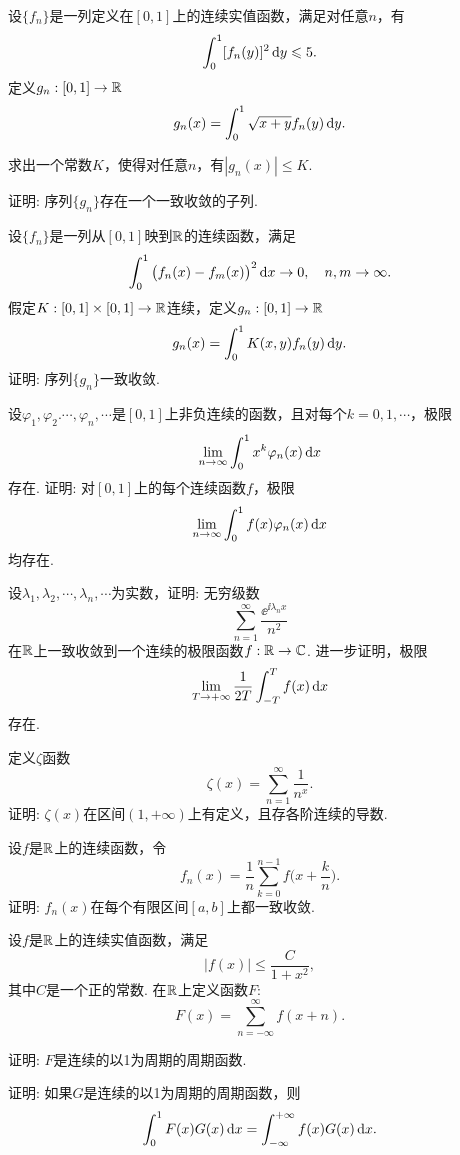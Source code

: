 \begin{example}
  设$\{f_n\}$是一列定义在$[0,1]$上的连续实值函数，满足对任意$n$，有
  \[ \int_0^1[f_n(y)]^2\,\mathrm dy \leqslant 5. \]
  定义$g_n:[0,1]\to\mathbb R$
  \[ g_n(x) = \int_0^1\sqrt{x+y}f_n(y)\,\mathrm dy. \]
  \begin{eenum}
    \item 求出一个常数$K$，使得对任意$n$，有$|g_n(x)|\le K$.
    \item 证明: 序列$\{g_n\}$存在一个一致收敛的子列.
  \end{eenum}
\end{example}

\begin{example}
  设$\{f_n\}$是一列从$[0,1]$映到$\mathbb R$的连续函数，满足
  \[ \int_0^1\big( f_n(x)-f_m(x)\big)^2\,\mathrm dx\to0,\quad n,m\to\infty. \]
  假定$K:[0,1]\times[0,1]\to\mathbb R$连续，定义$g_n:[0,1]\to\mathbb R$
  \[ g_n(x) = \int_0^1K(x,y)f_n(y)\,\mathrm dy. \]
  证明: 序列$\{g_n\}$一致收敛.
\end{example}

\begin{example}
  设$\varphi_1,\varphi_2.\cdots,\varphi_n,\cdots$是$[0,1]$上非负连续的函数，且对每个$k=0,1,\cdots$，极限
  \[ \lim_{n\to\infty}\int_0^1x^k\varphi_n(x)\,\dx \]
  存在. 证明: 对$[0,1]$上的每个连续函数$f$，极限
  \[ \lim_{n\to\infty}\int_0^1f(x)\varphi_n(x)\,\dx \]
  均存在.
\end{example}

\begin{example}
  设$\lambda_1,\lambda_2,\cdots,\lambda_n,\cdots$为实数，证明: 无穷级数
  \[ \sum_{n=1}^\infty\frac{\ee^{\ii\lambda_nx}}{n^2} \]
  在$\mathbb R$上一致收敛到一个连续的极限函数$f:\mathbb R\to\mathbb C$. 进一步证明，极限
  \[\lim_{T\to+\infty}\frac1{2T}\int_{-T}^Tf(x)\,\dx\]
  存在.
\end{example}

\begin{example}
  定义$\zeta$函数
  \[ \zeta(x) = \sum_{n=1}^\infty \frac1{n^x}. \]
  证明: $\zeta(x)$在区间$(1,+\infty)$上有定义，且存各阶连续的导数.
\end{example}

\begin{example}
  设$f$是$\mathbb R$上的连续函数，令
  \[ f_n(x) = \frac1n\sum_{k=0}^{n-1}f\Big(x+\frac kn\Big). \]
  证明: $f_n(x)$在每个有限区间$[a,b]$上都一致收敛.
\end{example}

\begin{example}
  设$f$是$\mathbb R$上的连续实值函数，满足
  \[ |f(x)| \le \frac C{1+x^2}, \]
  其中$C$是一个正的常数. 在$\mathbb R$上定义函数$F$:
  \[ F(x)=\sum_{n=-\infty}^\infty f(x+n). \]
  \begin{eenum}
    \item 证明: $F$是连续的以1为周期的周期函数.
    \item 证明: 如果$G$是连续的以1为周期的周期函数，则
    \[ \int_0^1F(x)G(x)\,\mathrm dx = \int_{-\infty}^{+\infty}
    f(x)G(x)\,\mathrm dx. \]
  \end{eenum}
\end{example}

